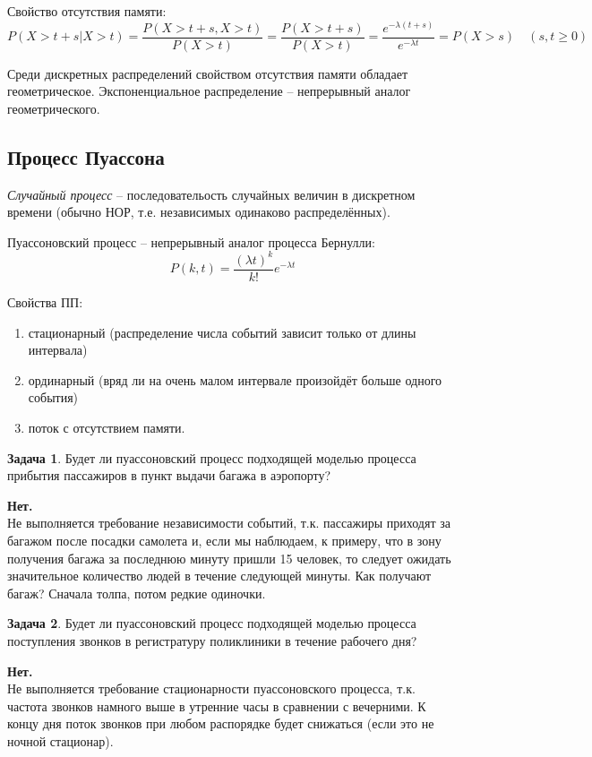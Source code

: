 \documentclass[a4paper,12pt,fleqn]{article}
\newenvironment{onsamepage} {\begin{minipage}{\textwidth}} {\end{minipage}}
\numberwithin{figure}{section}
\theoremstyle{definition}
\newtheorem{problem}{Задача}[section]
\let\geqs\geqslant
\begin{document}
Свойство отсутствия памяти:
\[ P(X>t+s|X>t) = \frac{P(X>t+s,X>t)}{P(X>t)} = \frac{P(X>t+s)}{P(X>t)} =
   \frac{e^{-\lambda(t+s)}}{e^{-\lambda t}}=P(X>s) \quad (s,t\!\geqs\!0) \]

Среди дискретных распределений свойством отсутствия памяти обладает геометрическое.
Экспоненциальное распределение -- непрерывный аналог геометрического.


\subsection{Процесс Пуассона}

\textit{Случайный процесс} -- последовательость случайных величин в дискретном времени
(обычно НОР, т.е. независимых одинаково распределённых).


Пуассоновский процесс -- непрерывный аналог процесса Бернулли:
	\[ P(k,t) = \frac{(\lambda t)^k}{k!} e^{-\lambda t} \]


Свойства ПП:
\begin{enumerate}
	\item стационарный (распределение числа событий зависит только от длины интервала)
	\item ординарный (вряд ли на очень малом интервале произойдёт больше одного события)
	\item поток с отсутствием памяти.
\end{enumerate}


\begin{problem}
	Будет ли пуассоновский процесс подходящей моделью процесса
	прибытия пассажиров в пункт выдачи багажа в аэропорту?
\end{problem}
\begin{solution}
  \textbf{Нет.}\\
	Не выполняется требование независимости событий, т.к.
	пассажиры приходят за багажом после посадки самолета и, если мы наблюдаем,
	к примеру, что в зону получения багажа за последнюю минуту пришли 15 человек,
	то следует ожидать значительное количество людей в течение следующей минуты.
	Как получают багаж? Сначала толпа, потом редкие одиночки.
\end{solution}


\begin{onsamepage}
\begin{problem}
	Будет ли пуассоновский процесс подходящей моделью процесса поступления
	звонков в регистратуру поликлиники в течение рабочего дня?
\end{problem}
\begin{solution}
  \textbf{Нет.}\\
	Не выполняется требование стационарности пуассоновского процесса, т.к.
	частота звонков намного выше в утренние часы в сравнении с вечерними.
	К концу дня поток звонков при любом распорядке будет снижаться
	(если это не ночной стационар).
\end{solution}
\end{onsamepage}
\end{document}
